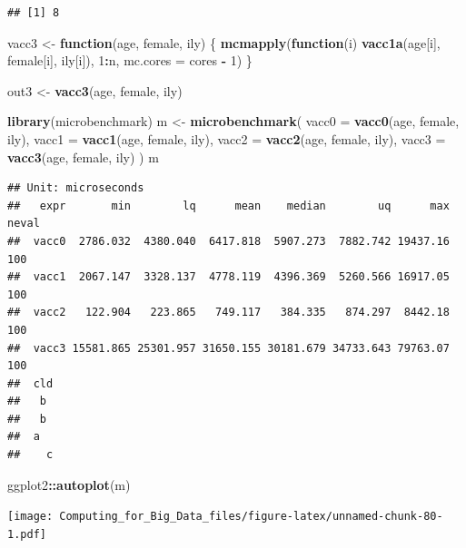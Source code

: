 \documentclass[]{book}
\newenvironment{Shaded}{\begin{snugshade}}{\end{snugshade}}
\newcommand{\KeywordTok}[1]{\textcolor[rgb]{0.13,0.29,0.53}{\textbf{#1}}}
\newcommand{\DataTypeTok}[1]{\textcolor[rgb]{0.13,0.29,0.53}{#1}}
\newcommand{\DecValTok}[1]{\textcolor[rgb]{0.00,0.00,0.81}{#1}}
\newcommand{\StringTok}[1]{\textcolor[rgb]{0.31,0.60,0.02}{#1}}
\newcommand{\ControlFlowTok}[1]{\textcolor[rgb]{0.13,0.29,0.53}{\textbf{#1}}}
\newcommand{\OperatorTok}[1]{\textcolor[rgb]{0.81,0.36,0.00}{\textbf{#1}}}
\newcommand{\NormalTok}[1]{#1}
\theoremstyle{definition}
\theoremstyle{definition}
\theoremstyle{definition}
\theoremstyle{remark}
\begin{document}
\begin{verbatim}
## [1] 8
\end{verbatim}

\begin{Shaded}
\begin{Highlighting}[]
\NormalTok{vacc3 <-}\StringTok{ }\ControlFlowTok{function}\NormalTok{(age, female, ily) \{}
  \KeywordTok{mcmapply}\NormalTok{(}\ControlFlowTok{function}\NormalTok{(i) }\KeywordTok{vacc1a}\NormalTok{(age[i], female[i], ily[i]), }\DecValTok{1}\OperatorTok{:}\NormalTok{n, }\DataTypeTok{mc.cores =}\NormalTok{ cores }\OperatorTok{-}\StringTok{ }\DecValTok{1}\NormalTok{)}
\NormalTok{\}}

\NormalTok{out3 <-}\StringTok{ }\KeywordTok{vacc3}\NormalTok{(age, female, ily)}
\end{Highlighting}
\end{Shaded}

\begin{Shaded}
\begin{Highlighting}[]
\KeywordTok{library}\NormalTok{(microbenchmark)}
\NormalTok{m <-}\StringTok{ }\KeywordTok{microbenchmark}\NormalTok{(}
  \DataTypeTok{vacc0 =} \KeywordTok{vacc0}\NormalTok{(age, female, ily),}
  \DataTypeTok{vacc1 =} \KeywordTok{vacc1}\NormalTok{(age, female, ily),}
  \DataTypeTok{vacc2 =} \KeywordTok{vacc2}\NormalTok{(age, female, ily),}
  \DataTypeTok{vacc3 =} \KeywordTok{vacc3}\NormalTok{(age, female, ily)}
\NormalTok{)}
\NormalTok{m}
\end{Highlighting}
\end{Shaded}

\begin{verbatim}
## Unit: microseconds
##   expr       min        lq      mean    median        uq      max neval
##  vacc0  2786.032  4380.040  6417.818  5907.273  7882.742 19437.16   100
##  vacc1  2067.147  3328.137  4778.119  4396.369  5260.566 16917.05   100
##  vacc2   122.904   223.865   749.117   384.335   874.297  8442.18   100
##  vacc3 15581.865 25301.957 31650.155 30181.679 34733.643 79763.07   100
##  cld
##   b 
##   b 
##  a  
##    c
\end{verbatim}

\begin{Shaded}
\begin{Highlighting}[]
\NormalTok{ggplot2}\OperatorTok{::}\KeywordTok{autoplot}\NormalTok{(m)}
\end{Highlighting}
\end{Shaded}

\texttt{[image: Computing\_for\_Big\_Data\_files/figure-latex/unnamed-chunk-80-1.pdf]}
\end{document}
